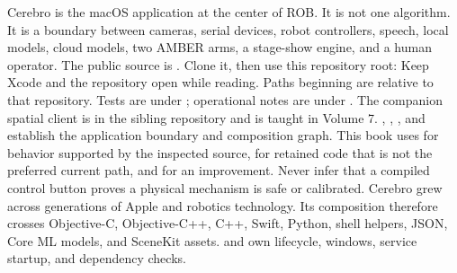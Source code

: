\markdownRendererDocumentBegin
\markdownRendererSectionBegin
{}\markdownRendererInterblockSeparator
{}Cerebro is the macOS application at the center of ROB. It is not one algorithm. It is a boundary between cameras, serial devices, robot controllers, speech, local models, cloud models, two AMBER arms, a stage-show engine, and a human operator. The public source is . Clone it, then use this repository root:\markdownRendererInterblockSeparator
{}\markdownRendererInterblockSeparator
{}Keep Xcode and the repository open while reading. Paths beginning  are relative to that repository. Tests are under ; operational notes are under . The companion spatial client is in the sibling  repository and is taught in Volume 7.\markdownRendererInterblockSeparator
{}\markdownRendererBlockQuoteBegin
{} , , , and  establish the application boundary and composition graph.\markdownRendererBlockQuoteEnd \markdownRendererInterblockSeparator
{}This book uses  for behavior supported by the inspected source,  for retained code that is not the preferred current path, and  for an improvement. Never infer that a compiled control button proves a physical mechanism is safe or calibrated.\markdownRendererInterblockSeparator
{}
\markdownRendererSectionEnd \markdownRendererSectionBegin
{}\markdownRendererInterblockSeparator
{}Cerebro grew across generations of Apple and robotics technology. Its composition therefore crosses Objective-C, Objective-C++, C++, Swift, Python, shell helpers, JSON, Core ML models, and SceneKit assets.\markdownRendererInterblockSeparator
{}\markdownRendererUlBegin
\markdownRendererUlItem {}  and  own lifecycle, windows, service startup, and dependency checks.\markdownRendererUlItemEnd 
